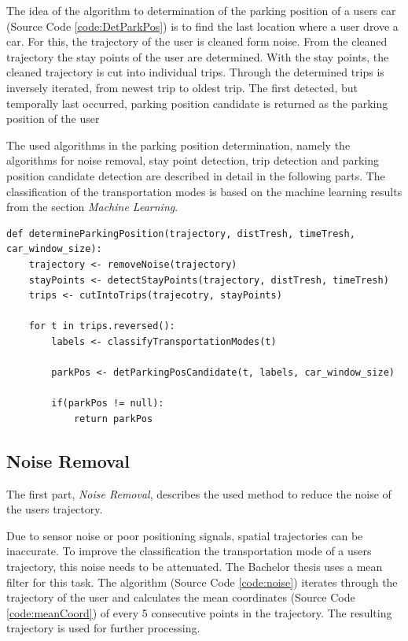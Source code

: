 The idea of the algorithm to determination of the parking position of a users car (Source Code \ref{code:DetParkPos}) is to find the last location where a user drove a car. For this, the trajectory of the user is cleaned form noise. From the cleaned trajectory the stay points of the user are determined. With the stay points, the cleaned trajectory is cut into individual trips. Through the determined trips is inversely iterated, from newest trip to oldest trip. The first detected, but temporally last occurred, parking position candidate is returned as the parking position of the user

The used algorithms in the parking position determination, namely the algorithms for noise removal, stay point detection, trip detection and parking position candidate detection are described in detail in the following parts. The classification of the transportation modes is based on the machine learning results from the section \textit{Machine Learning}.


\begin{lstlisting}[style=py, caption={Pseudocode: Determine Parking Position Candidate}, label={code:DetParkPos}]
def determineParkingPosition(trajectory, distTresh, timeTresh, car_window_size):
    trajectory <- removeNoise(trajectory)
    stayPoints <- detectStayPoints(trajectory, distTresh, timeTresh)
    trips <- cutIntoTrips(trajecotry, stayPoints)
    
    for t in trips.reversed():
        labels <- classifyTransportationModes(t)
        
        parkPos <- detParkingPosCandidate(t, labels, car_window_size)
        
        if(parkPos != null):
            return parkPos
\end{lstlisting}



\subsection{Noise Removal}
The first part, \textit{Noise Removal}, describes the used method to reduce the noise of the users trajectory.

Due to sensor noise or poor positioning signals, spatial trajectories can be inaccurate. To improve the classification the transportation mode of a users trajectory, this noise needs to be attenuated. The Bachelor thesis uses a mean filter for this task. The algorithm (Source Code \ref{code:noise}) iterates through the trajectory of the user and calculates the mean coordinates (Source Code \ref{code:meanCoord}) of every 5 consecutive points in the trajectory. The resulting trajectory is used for further processing. \cite{Zheng:2015:TDM:2764959.2743025}


